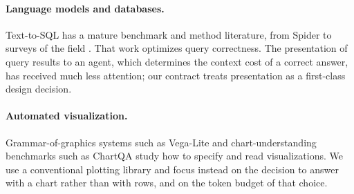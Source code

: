 \paragraph{Language models and databases.}
Text-to-SQL has a mature benchmark and method literature, from Spider \cite{spider2018} to surveys of the field \cite{text2sqlsurvey2022}. That work optimizes query correctness. The presentation of query results to an agent, which determines the context cost of a correct answer, has received much less attention; our contract treats presentation as a first-class design decision.

\paragraph{Automated visualization.}
Grammar-of-graphics systems such as Vega-Lite \cite{vegalite2017} and chart-understanding benchmarks such as ChartQA \cite{chartqa2022} study how to specify and read visualizations. We use a conventional plotting library \cite{hunter2007matplotlib} and focus instead on the decision to answer with a chart rather than with rows, and on the token budget of that choice.
